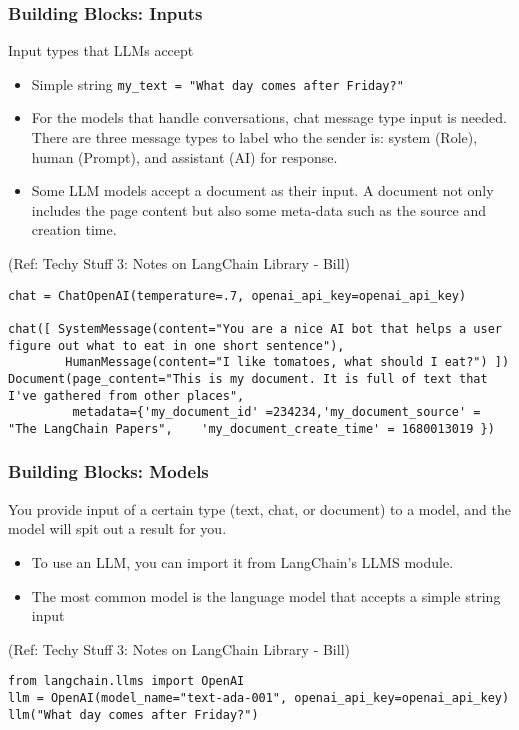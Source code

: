 \begin{frame}[fragile]\frametitle{Building Blocks: Inputs}

Input types that LLMs accept

\begin{itemize}
\item Simple string \lstinline|my_text = "What day comes after Friday?"|
\item For the models that handle conversations, chat message type input is needed. There are three message types to label who the sender is: system (Role), human (Prompt), and assistant (AI) for response.
\item Some LLM models accept a document as their input. A document not only includes the page content but also some meta-data such as the source and creation time.
\end{itemize}

{\tiny (Ref: Techy Stuff 3: Notes on LangChain Library - Bill)}

\begin{lstlisting}
chat = ChatOpenAI(temperature=.7, openai_api_key=openai_api_key)

chat([ SystemMessage(content="You are a nice AI bot that helps a user figure out what to eat in one short sentence"),
        HumanMessage(content="I like tomatoes, what should I eat?") ])
Document(page_content="This is my document. It is full of text that I've gathered from other places",
         metadata={'my_document_id' =234234,'my_document_source' = "The LangChain Papers",    'my_document_create_time' = 1680013019 })
\end{lstlisting}	  


\end{frame}

\begin{frame}[fragile]\frametitle{Building Blocks: Models}

You provide input of a certain type (text, chat, or document) to a model, and the model will spit out a result for you.

\begin{itemize}
\item To use an LLM, you can import it from LangChain’s LLMS module.
\item The most common model is the language model that accepts a simple string input
\end{itemize}

{\tiny (Ref: Techy Stuff 3: Notes on LangChain Library - Bill)}

\begin{lstlisting}
from langchain.llms import OpenAI
llm = OpenAI(model_name="text-ada-001", openai_api_key=openai_api_key)
llm("What day comes after Friday?")
\end{lstlisting}	  


\end{frame}

